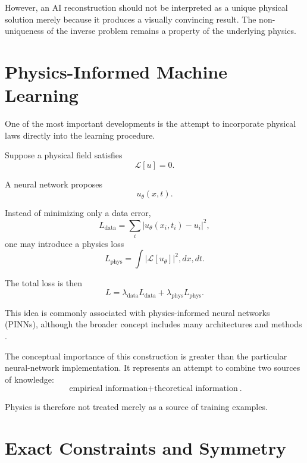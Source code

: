 \documentclass[11pt,a4paper]{article}
\begin{document}
However, an AI reconstruction should not be interpreted as a unique physical
solution merely because it produces a visually convincing result. The
non-uniqueness of the inverse problem remains a property of the underlying
physics.

\section{Physics-Informed Machine Learning}

One of the most important developments is the attempt to incorporate physical
laws directly into the learning procedure.

Suppose a physical field satisfies
\begin{equation}
\mathcal{L}[u]=0.
\end{equation}

A neural network proposes
\begin{equation}
u_\theta(x,t).
\end{equation}

Instead of minimizing only a data error,
\begin{equation}
L_{\mathrm{data}} =
\sum_i
\left|u_\theta(x_i,t_i)-u_i\right|^2,
\end{equation}
one may introduce a physics loss
\begin{equation}
L_{\mathrm{phys}}=
\int
\left|
\mathcal{L}[u_\theta]
\right|^2,dx,dt.
\end{equation}

The total loss is then
\begin{equation}
L=
\lambda_{\mathrm{data}}L_{\mathrm{data}}
+
\lambda_{\mathrm{phys}}L_{\mathrm{phys}}.
\end{equation}

This idea is commonly associated with physics-informed neural networks
(PINNs), although the broader concept includes many architectures and methods
\cite{Karn2021}.

The conceptual importance of this construction is greater than the particular
neural-network implementation. It represents an attempt to combine two sources
of knowledge:
\begin{equation}
\boxed{
\text{empirical information}
+
\text{theoretical information}
}.
\end{equation}

Physics is therefore not treated merely as a source of training examples.

\section{Exact Constraints and Symmetry}
\end{document}
